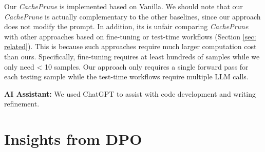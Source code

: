\documentclass[11pt]{article}
\begin{document}

Our \textit{CachePrune} is implemented based on Vanilla. 
We should note that our \textit{CachePrune} is actually complementary to the other baselines, since our approach does not modify the prompt.
In addition, its is unfair comparing \textit{CachePrune} with other approaches based on fine-tuning or test-time workflows (Section \ref{sec: related}).  This is because such approaches require much larger computation cost than ours. Specifically, fine-tuning requires at least hundreds of samples while we only need < 10 samples. Our approach only requires a single forward pass for each testing sample while the test-time workflows require multiple LLM calls.

\noindent\textbf{AI Assistant:}  We used ChatGPT to assist with code development and writing refinement.


\section{Insights from  DPO} \label{app: rel}
\end{document}
